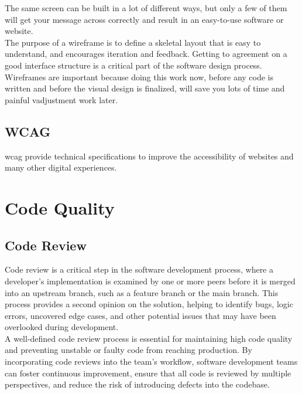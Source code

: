The same screen can be built in a lot of different ways, but only a few of them will get your message across correctly and result in an easy-to-use software or website. \cite{balsamiq:wireframe} \\

The purpose of a wireframe is to define a skeletal layout that is easy to understand, and encourages iteration and feedback. Getting to agreement on a good interface structure is a critical part of the software design process. \cite{balsamiq:wireframe} \\

Wireframes are important because doing this work now, before any code is written and before the visual design is finalized, will save you lots of time and painful vadjustment work later. \cite{balsamiq:wireframe} 

\subsection{WCAG}
\label{subsec:wcag}

\gls{wcag} provide technical specifications to improve the accessibility of websites and many other digital experiences. \cite{levelaccess:wcag}

\section{Code Quality}
\label{sec:code-quality}

\subsection{Code Review}
\label{subsec:code-review}

Code review is a critical step in the software development process, where a developer's implementation is examined by one or more peers before it is merged into an upstream branch, such as a feature branch or the main branch. This process provides a second opinion on the solution, helping to identify bugs, logic errors, uncovered edge cases, and other potential issues that may have been overlooked during development. \cite{gitlab:code-review} \\

A well-defined code review process is essential for maintaining high code quality and preventing unstable or faulty code from reaching production. By incorporating code reviews into the team's workflow, software development teams can foster continuous improvement, ensure that all code is reviewed by multiple perspectives, and reduce the risk of introducing defects into the codebase. \cite{gitlab:code-review} \\

